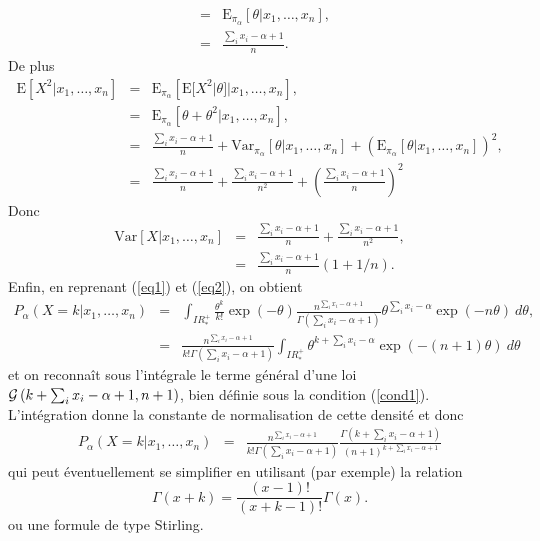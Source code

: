 \documentclass[10pt]{article}
\newcommand{\R}{I\!\!R}
\newcommand{\E}{\mbox{E}}
\newcommand{\V}{\mbox{Var}}
\newcommand{\1}{\mathbbm{1}}
\begin{document}
\begin{enumerate}
\begin{eqnarray*}
& = &  \E_{\pi_{\alpha}}\left[\theta | x_1,\ldots,x_n\right], \\
& = & \frac{\sum_i x_i-\alpha+1}{n}.
\end{eqnarray*}
De plus 
\begin{eqnarray*}
\E[X^2|x_1,\ldots,x_n] &= & \E_{\pi_{\alpha}}\left[\E[X^2|\theta] | x_1,\ldots,x_n\right], \\
& = &  \E_{\pi_{\alpha}}\left[\theta + \theta^2| x_1,\ldots,x_n\right], \\
& = & \frac{\sum_i x_i-\alpha+1}{n} + \V_{\pi_{\alpha}}\left[\theta| x_1,\ldots,x_n\right] + \left(\E_{\pi_{\alpha}}\left[\theta| x_1,\ldots,x_n\right]\right)^2, \\
& = & \frac{\sum_i x_i-\alpha+1}{n} + \frac{\sum_i x_i-\alpha+1}{n^2} + \left(\frac{\sum_i x_i-\alpha+1}{n}\right)^2
\end{eqnarray*}
Donc
\begin{eqnarray*}
\V[X|x_1,\ldots,x_n] &= & \frac{\sum_i x_i-\alpha+1}{n} + \frac{\sum_i x_i-\alpha+1}{n^2}, \\
& = & \frac{\sum_i x_i-\alpha+1}{n}\left(1+1/n\right).
\end{eqnarray*}
Enfin, en reprenant (\ref{eq1}) et (\ref{eq2}), on obtient 
\begin{eqnarray*}
P_{\alpha}(X=k|x_1,\ldots,x_n) & = & \int_{\R^+_*} \frac{\theta^k}{k!}\exp(-\theta) \frac{n^{\sum_i x_i-\alpha+1}}{\Gamma(\sum_i x_i-\alpha+1)} \theta^{\sum_i x_i-\alpha} \exp\left(-n\theta \right) \ d\theta, \\
& = &  \frac{n^{\sum_i x_i-\alpha+1}}{k!\Gamma(\sum_i x_i-\alpha+1)}  \int_{\R^+_*} \theta^{k + \sum_i x_i-\alpha} \exp\left(-(n+1)\theta \right) \ d\theta
\end{eqnarray*}
et on reconnaît sous l'intégrale le terme général d'une loi ${\cal{G}}\left(k+\sum_i x_i-\alpha+1,n+1\right)$, bien définie sous la condition (\ref{cond1}). L'intégration donne la constante de normalisation de cette densité et donc
\begin{eqnarray*}
P_{\alpha}(X=k|x_1,\ldots,x_n) & = & \frac{n^{\sum_i x_i-\alpha+1}}{k!\Gamma(\sum_i x_i-\alpha+1)} \frac{\Gamma(k+\sum_i x_i-\alpha+1)} {(n+1)^{k+\sum_i x_i-\alpha+1}}
\end{eqnarray*}
qui peut éventuellement se simplifier en utilisant (par exemple) la relation
$$
\Gamma(x+k) = \frac{(x-1)!}{(x+k-1)!} \Gamma(x).
$$
ou une formule de type Stirling. 
\end{enumerate}
\end{document}
